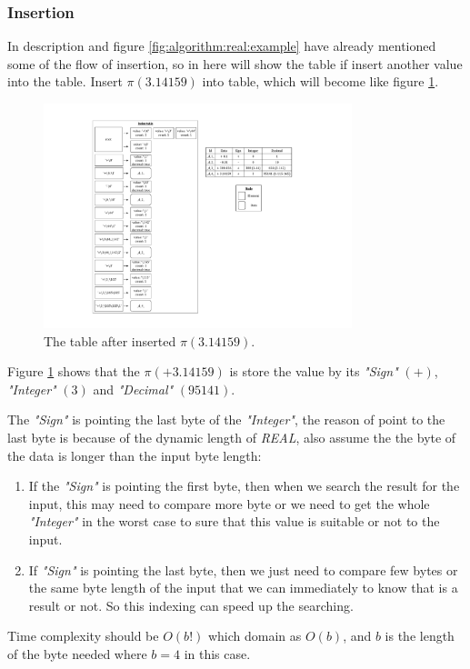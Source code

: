 \subsubsection{Insertion}

In description and figure \ref{fig:algorithm:real:example} have already mentioned some of the flow of insertion, so in here will show the table if insert another value into the table. Insert $\pi (3.14159)$ into table, which will become like figure \ref{fig:algorithm:real:insertion:example}.

\begin{figure}[h]
\centering
\includegraphics[width=0.8\textwidth]{./algorithm/real/pic/insertion/example_v4.pdf}
\caption{The table after inserted $\pi (3.14159)$.}
\label{fig:algorithm:real:insertion:example}
\end{figure}

Figure \ref{fig:algorithm:real:insertion:example} shows that the $\pi (+3.14159)$ is store the value by its \textit{"Sign"} $(+)$, \textit{"Integer"} $(3)$ and \textit{"Decimal"} $(95141)$.

The \textit{"Sign"} is pointing the last byte of the \textit{"Integer"}, the reason of point to the last byte is because of the dynamic length of \textit{REAL}, also assume the the byte of the data is longer than the input byte length:

\begin{enumerate}

\item  If the \textit{"Sign"} is pointing the first byte, then when we search the result for the input, this may need to compare more byte or we need to get the whole \textit{"Integer"} in the worst case to sure that this value is suitable or not to the input.

\item If \textit{"Sign"} is pointing the last byte, then we just need to compare few bytes or the same byte length of the input that we can immediately to know that is a result or not. So this indexing can speed up the searching.

\end{enumerate}

Time complexity should be $O(b!)$ which domain as $O(b)$, and $b$ is the length of the byte needed where $b = 4$ in this case.

